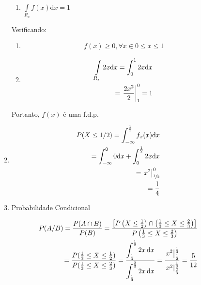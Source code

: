 \begin{description}
\begin{enumerate}[label=(\alph*)]
\begin{enumerate}[leftmargin=*, label=\roman*., widest=IV, align=left]
               \item $\int \limits_{R_{x}} f(x)\mathrm{d}x=1$
             \end{enumerate}
             Verificando:         
             \begin{enumerate}[leftmargin=*, label=\roman*., widest=IV, align=left]
               \item 
               \begin{align*}                 f(x)\geq 0, \forall x \in  0 \le x \le 1\end{align*}
               \item 
                 \begin{align*}
                   \int \limits_{R_x} 2x \mathrm{d}x
                   =\int_{0}^1 2x \mathrm{d}x\\ 
                   = \left.\frac{2x^2}{2}\right\rvert_{1}^{0}= 1
                 \end{align*}

             \end{enumerate}


             Portanto, $f(x)$ é uma f.d.p.\

           \item 
             \begin{align*}
               P(X \leq 1/2) = \int_{-\infty}^{\frac{1}{2}} f_x (x) \mathrm{d}x\\
               = \int_{-\infty}^0 0 \mathrm{d}x + \int_{0}^{\frac{1}{2}} 2x \mathrm{d}x \\
               = \left.x^2\right\rvert_{{\sfrac{1}{2}}}^{0}\\
               =\frac{1}{4} 
             \end{align*}
           \item Probabilidade Condicional
             \begin{figure}[H]
               \centering
               
               \label{fig:26}
             \end{figure}
             \begin{align*}
               P(A/B)= \frac{P(A\cap B)}{P(B)} 
               =\frac{ \left[   P\left( X \leq \frac{1}{2} \right)\cap \left(\frac{1}{3} \leq X \leq \frac{2}{3}\right)\right]}{P \left( \frac{1}{3} \leq X \leq \frac{2}{3}\right)}\\
               = \frac{P( \frac{1}{3} \leq X \leq \frac{1}{2} )}{P( \frac{1}{3} \leq X \leq \frac{2}{3} )}
               = \frac{\displaystyle{\int_{\frac{1}{3}}^{\frac{1}{2}} 2x \,\mathrm{d}x}}{\displaystyle{\int_{\frac{1}{3}}^{\frac{2}{3}} 2x \,\mathrm{d}x}} 
               = \frac{\displaystyle{\left.x^2\right\rvert_{{\frac{1}{2}}}^{{\frac{1}{3}}}}}{ \left.x^2\right\rvert_{{\frac{2}{3}}}^{{\frac{1}{3}}}}
               = \frac{5}{12}
             \end{align*}
         \end{enumerate}

     \end{description}
